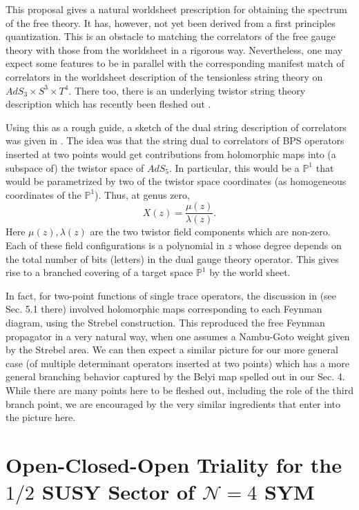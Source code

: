 \documentclass[english]{article}
\renewcommand{\>}{\rangle}
\newcommand{\<}{\langle}
\renewcommand{\(}{\left(}
\renewcommand{\)}{\right)}
\begin{document}
This proposal gives a natural worldsheet prescription for obtaining the spectrum of the free theory. It has, however, not yet been derived from a first principles quantization. This is an obstacle to matching the correlators of the free gauge theory with those from the worldsheet in a rigorous way. Nevertheless, one may expect some features to be in parallel with the corresponding manifest match of correlators in the worldsheet description of the tensionless string theory on $AdS_3\times S^3 \times T^4$. There too, there is an underlying twistor string theory description \cite{dei2021free} which has recently been fleshed out \cite{McStay:2023thk, McStay:2024dtk}. 

Using this as a rough guide, 
a sketch of the dual string description of correlators was given in \cite{Bhat:2021dez}. 
The idea was that the string dual to correlators of BPS operators inserted at two points would get contributions from holomorphic maps into (a subspace of) the twistor space of $AdS_5$. In particular, this would be a ${\mathbb P}^1$ that would be parametrized by two of the twistor space coordinates (as homogeneous coordinates of the ${\mathbb P}^1$). Thus, at genus zero,
\begin{equation}
    X(z)=\frac{\mu(z)}{\lambda(z)}.
\end{equation}
Here $\mu(z), \lambda(z)$ are the two twistor field components which are non-zero. Each of these field configurations is a polynomial in $z$ whose degree depends on the total number of bits (letters) in the dual gauge theory operator. This gives rise to a branched covering of a target space $\mathbb{P}^1$ by the world sheet.  

In fact, for two-point functions of single trace operators, the discussion in   
\cite{Bhat:2021dez} (see Sec. 5.1 there) involved holomorphic maps 
corresponding to each Feynman diagram, using the Strebel construction. This reproduced the free Feynman propagator in a very natural way, when one assumes a Nambu-Goto weight given by the Strebel area. We can then expect a similar picture for our more general case (of multiple determinant operators inserted 
at two points) which has a more general branching behavior captured by the Belyi map spelled out in our Sec. 4. While there are many points here to be fleshed out, including the role of the third branch point, we are encouraged by the very similar ingredients that enter into the picture here.  
\pagebreak



\section{Open-Closed-Open Triality for the $1/2$ SUSY Sector of $\mathcal{N}=4$ SYM } \label{sec:OCOgen}
\end{document}
